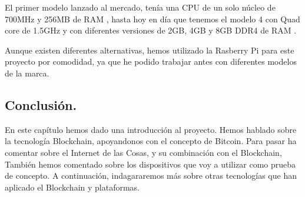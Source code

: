 \vspace{5mm}

\noindent El primer modelo lanzado al mercado, tenía una CPU de un solo núcleo de 700MHz y 256MB de RAM 
\cite{what-is-rasp2}, hasta hoy en día que tenemos el modelo 4 con Quad core de 1.5GHz y con diferentes versiones de 
2GB, 4GB y 8GB DDR4 de RAM \cite{rasp-model-4-specifications}.

\vspace{5mm}

\noindent Aunque existen diferentes alternativas, hemos utilizado la Rasberry Pi para este proyecto por comodidad, ya 
que he podido trabajar antes con diferentes modelos de la marca.

\subsection{Conclusión.}

En este capítulo hemos dado una introducción al proyecto. Hemos hablado sobre la tecnología Blockchain, apoyandonos 
con el concepto de Bitcoin. Para pasar ha comentar sobre el Internet de las Cosas, y su combinación con el Blockchain, 
También hemos comentado sobre los dispositivos que voy a utilizar como prueba de concepto. A continuación, indagararemos 
más sobre otras tecnologías que han aplicado el Blockchain y plataformas.

\newpage